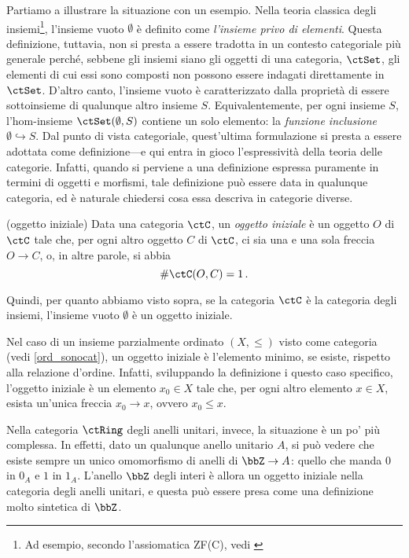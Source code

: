 \Todo{}
Partiamo a illustrare la situazione con un esempio. Nella teoria classica degli insiemi\footnote{Ad esempio, secondo l'assiomatica ZF(C), vedi \cite{ZFC}}, l'insieme vuoto \(\emptyset\) è definito come \emph{l'insieme privo di elementi}. Questa definizione, tuttavia, non si presta a essere tradotta in un contesto categoriale più generale perché, sebbene gli insiemi siano gli oggetti di una categoria, \(\ctSet\), gli elementi di cui essi sono composti non possono essere indagati direttamente in \(\ctSet\). D'altro canto, l'insieme vuoto è caratterizzato dalla  proprietà di essere sottoinsieme di qualunque altro insieme \(S\). Equivalentemente, per ogni insieme \(S\), l'hom-insieme \(\Hom\ctSet(\emptyset,S)\) contiene un solo elemento: la  \emph{funzione inclusione}  \(\emptyset \hookrightarrow S\). Dal punto di vista categoriale, quest'ultima formulazione si presta a essere adottata come definizione---e qui entra in gioco l'espressività della teoria delle categorie. Infatti, quando si perviene a una definizione espressa puramente in termini di oggetti e morfismi,  tale definizione può essere data in qualunque categoria, ed è naturale chiedersi cosa essa descriva in categorie diverse.

\begin{example}(oggetto iniziale)\label{ex_oggetto_iniziale}
	Data una categoria \(\ctC\), un \emph{oggetto iniziale} è un oggetto \(O\) di \(\ctC\) tale che, per ogni altro oggetto \(C\) di \(\ctC\), ci sia una e una sola freccia \(O\to C\), o, in altre parole, si abbia
	\begin{equation}\label{def_oggetto_iniziale}
		\#\Hom\ctC(O,C)=1\,.
	\end{equation}

	Quindi, per quanto abbiamo visto sopra, se la categoria \(\ctC\) è la categoria degli insiemi, l'insieme vuoto \(\emptyset\)  è un oggetto iniziale.

	Nel caso di un insieme parzialmente ordinato \((X, \leqslant)\) visto come categoria (vedi \ref{ord_sonocat}), un oggetto iniziale è l'elemento minimo, se esiste, rispetto alla relazione d'ordine. Infatti, sviluppando la definizione i questo caso specifico, l'oggetto iniziale è un elemento \(x_0\in X\) tale che, per ogni altro elemento \(x\in X\), esista un'unica freccia \(x_0\to x\), ovvero \(x_0\leqslant x\).

	Nella categoria \(\ctRing\) degli anelli unitari, invece, la situazione è un po' più complessa. In effetti, dato un qualunque anello  unitario \(A\), si può vedere che esiste sempre un unico omomorfismo di anelli di \(\bbZ\to A\): quello che manda \(0\) in \(0_A\) e \(1\) in \(1_A\). L'anello \(\bbZ\) degli interi è allora un oggetto iniziale nella categoria degli anelli unitari, e questa può essere presa come una definizione molto sintetica di \(\bbZ\).
\end{example}

